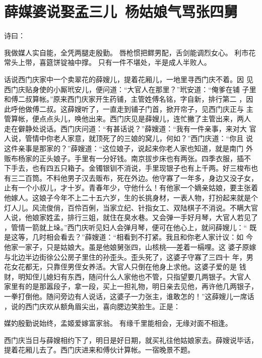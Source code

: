 \chapter{薛媒婆说娶孟三儿~杨姑娘气骂张四舅}

诗曰：

我做媒人实自能，全凭两腿走殷勤。
唇枪惯把鳏男配，舌剑能调烈女心。
利市花常头上带，喜筵饼锭袖中撑。
只有一件不堪处，半是成人半败人。

话说西门庆家中一个卖翠花的薛嫂儿，提着花厢儿，一地里寻西门庆不着。因
见西门庆贴身使的小厮玳安儿，便问道：“大官人在那里？”玳安道：“俺爹在铺
子里和傅二叔算帐。”原来西门庆家开生药铺，主管姓傅名铭，字自新，排行第二
，因此呼他做傅二叔。这薛嫂听了，一直走到铺子门首，掀开帘子，见西门庆正与
主管算帐，便点点头儿，唤他出来。西门庆见是薛嫂儿，连忙撇了主管出来，两人
走在僻静处说话。西门庆问道：“有甚话说？”薛嫂道：“我有一件亲事，来对大
官人说，管情中你老人家意，就顶死了的三娘的窝儿，何如？”西门庆道：“你且
说这件亲事是那家的？”薛嫂道：“这位娘子，说起来你老人家也知道，就是南门
外贩布杨家的正头娘子。手里有一分好钱。南京拔步床也有两张。四季衣服，插不
下手去，也有四五只箱子。金镯银钏不消说，手里现银子也有上千两。好三梭布也
有三二百筒。不料他男子汉去贩布，死在外边。他守寡了一年多，身边又没子女，
止有一个小叔儿，才十岁。青春年少，守他什么！有他家一个嫡亲姑娘，要主张着
他嫁人。这娘子今年不上二十五六岁，生的长挑身材，一表人物，打扮起来就是个
灯人儿。风流俊俏，百伶百俐，当家立纪、针指女工、双陆棋子不消说。不瞒大官
人说，他娘家姓孟，排行三姐，就住在臭水巷。又会弹一手好月琴，大官人若见了
，管情一箭就上垛。”西门庆听见妇人会弹月琴，便可在他心上，就问薛嫂儿：“
既是这等，几时相会看去？”薛嫂道：“相看到不打紧。我且和你老人家计议：如
今他家一家子，只是姑娘大。虽是他娘舅张四，山核桃──差着一槅哩。这
婆子原嫁与北边半边街徐公公房子里住的孙歪头。歪头死了，这婆子守寡了三四十
年，男花女花都无，只靠侄男侄女养活。大官人只倒在他身上求他。这婆子爱的是
钱财，明知侄儿媳妇有东西，随问什么人家他也不管，只指望要几两银子。大官人
家里有的是那嚣段子，拿一段，买上一担礼物，明日亲去见他，再许他几两银子，
一拳打倒他。随问旁边有人说话，这婆子一力张主，谁敢怎的！”这薛嫂儿一席话
，说的西门庆欢从额角眉尖出，喜向腮边笑脸生。正是：

媒妁殷勤说始终，孟姬爱嫁富家翁。
有缘千里能相会，无缘对面不相逢。

西门庆当日与薛嫂相约下了，明日是好日期，就买礼往他姑娘家去。薛嫂说毕话，
提着花厢儿去了。西门庆进来和傅伙计算帐。一宿晚景不题。

